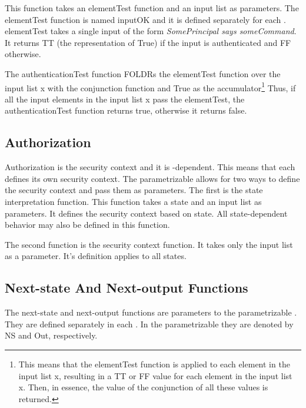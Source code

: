 \documentclass[../../main/main.tex]{subfiles}
\begin{document}
This function takes an elementTest function and an input list as parameters.  The elementTest function is named inputOK and it is defined separately for each .  elementTest takes a single input of the form \textit{SomePrincipal says someCommand}.  It returns TT (the  representation of True) if the input is authenticated and FF otherwise.  

The authenticationTest function FOLDRs the elementTest function over the input list x with the conjunction function and True as the accumulator\footnote{This means that the elementTest function is applied to each element in the input list x, resulting in a TT or FF value for each element in the input list x.   Then, in essence, the value of the conjunction of all these values is returned.}  Thus, if all the input elements in the input list x pass the elementTest, the authenticationTest function returns true, otherwise it returns false.  
     
\subsection{Authorization}
Authorization is the security context and it is -dependent. This means that each  defines its own security context.  The parametrizable  allows for two ways to define the security context and pass them as parameters.  The first is the state interpretation function. This function takes a state and an input list as parameters.  It defines the security context based on state.  All state-dependent behavior may also be defined in this function.

The second function is the security context function.  It takes only the input list as a parameter.  It's definition applies to all states.

\subsection{Next-state And Next-output Functions}
The next-state and next-output functions are parameters to the parametrizable .  They are defined separately in each .  In the parametrizable  they are denoted by NS and Out, respectively.
\end{document}

